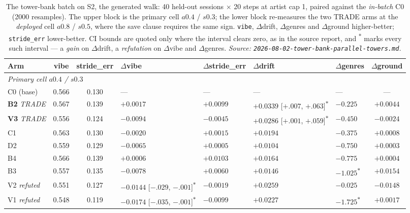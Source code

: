 \documentclass[11pt]{article}
\begin{document}
\begin{table}[ht]
  \centering
  \caption{The tower-bank batch on S2, the generated walk: \num{40} held-out
  sessions $\times$ \num{20} steps at artist cap 1, paired against the
  \emph{in-batch} C0 (\num{2000} resamples). The upper block is the primary cell
  $a\num{0.4}$ / $s\num{0.3}$; the lower block re-measures the two TRADE arms at
  the \emph{deployed} cell $a\num{0.8}$ / $s\num{0.5}$, where the save clause
  requires the same sign. \texttt{vibe}, $\Delta$drift, $\Delta$genres and
  $\Delta$ground higher-better; \texttt{stride\_err} lower-better. CI bounds are
  quoted only where the interval clears zero, as in the source report, and
  \textsuperscript{$\ast$} marks every such interval --- a \emph{gain} on
  $\Delta$drift, a \emph{refutation} on $\Delta$vibe and $\Delta$genres.
  \emph{Source: \texttt{2026-08-02-tower-bank-parallel-towers.md}.}}
  \label{tab:nexttrack-towerbank-s2}
  {\scriptsize\setlength{\tabcolsep}{2.6pt}\begin{tabular}{lccllllc}
    \toprule
    Arm & vibe & stride\_err & $\Delta$vibe & $\Delta$stride\_err & $\Delta$drift & $\Delta$genres & $\Delta$ground \\
    \midrule
    \multicolumn{8}{l}{\emph{Primary cell $a\num{0.4}$ / $s\num{0.3}$}} \\
    C0 (base) & 0.566 & 0.130 & --- & --- & --- & --- & --- \\
    \textbf{B2} \emph{TRADE} & 0.567 & 0.139 & $+0.0017$ & $+0.0099$ & $\mathbf{+0.0339}$ [$+.007$, $+.063$]\textsuperscript{$\ast$} & $-0.225$ & $+0.0044$ \\
    \textbf{V3} \emph{TRADE} & 0.556 & 0.124 & $-0.0094$ & $-0.0045$ & $\mathbf{+0.0286}$ [$+.001$, $+.059$]\textsuperscript{$\ast$} & $-0.450$ & $-0.0024$ \\
    C1 & 0.563 & 0.130 & $-0.0020$ & $+0.0015$ & $+0.0194$ & $-0.375$ & $+0.0008$ \\
    D2 & 0.559 & 0.129 & $-0.0065$ & $+0.0005$ & $+0.0104$ & $-0.750$ & $+0.0003$ \\
    B4 & 0.566 & 0.139 & $+0.0006$ & $+0.0103$ & $+0.0164$ & $-0.775$ & $+0.0004$ \\
    B3 & 0.557 & 0.135 & $-0.0078$ & $+0.0060$ & $+0.0146$ & $\mathbf{-1.025}$\textsuperscript{$\ast$} & $+0.0154$ \\
    V2 \emph{refuted} & 0.551 & 0.127 & $\mathbf{-0.0144}$ [$-.029$, $-.001$]\textsuperscript{$\ast$} & $-0.0019$ & $+0.0259$ & $-0.025$ & $-0.0148$ \\
    V1 \emph{refuted} & 0.548 & 0.119 & $\mathbf{-0.0174}$ [$-.035$, $-.001$]\textsuperscript{$\ast$} & $-0.0099$ & $+0.0227$ & $\mathbf{-1.725}$\textsuperscript{$\ast$} & $+0.0017$ \\

\end{tabular}}
\end{table}
\end{document}
